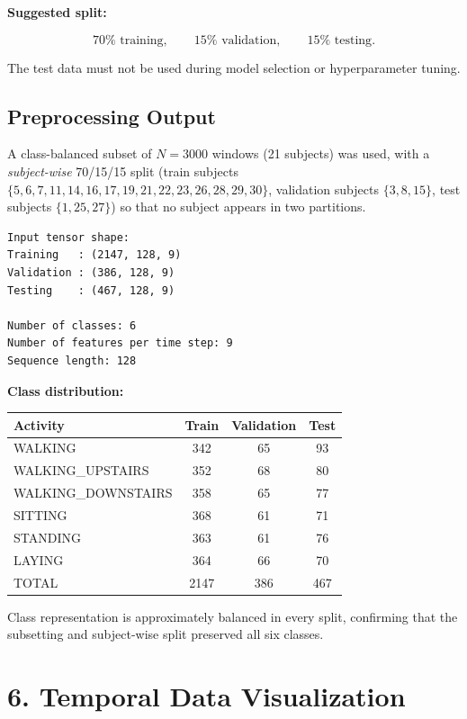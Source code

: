 \documentclass[10pt]{article}
\begin{document}
\textbf{Suggested split:}

\[
70\% \text{ training},\qquad
15\% \text{ validation},\qquad
15\% \text{ testing}.
\]

The test data must not be used during model selection or hyperparameter tuning.

\subsection*{Preprocessing Output}

A class-balanced subset of $N=3000$ windows (21 subjects) was used, with a
\emph{subject-wise} 70/15/15 split (train subjects
$\{5,6,7,11,14,16,17,19,21,22,23,26,28,29,30\}$, validation subjects
$\{3,8,15\}$, test subjects $\{1,25,27\}$) so that no subject appears in two
partitions.

\begin{verbatim}
Input tensor shape:
Training   : (2147, 128, 9)
Validation : (386, 128, 9)
Testing    : (467, 128, 9)

Number of classes: 6
Number of features per time step: 9
Sequence length: 128
\end{verbatim}

\textbf{Class distribution:}

\begin{center}
\begin{tabular}{|l|c|c|c|}
\hline
Activity & Train & Validation & Test\\
\hline
WALKING & 342 & 65 & 93\\
WALKING\_UPSTAIRS & 352 & 68 & 80\\
WALKING\_DOWNSTAIRS & 358 & 65 & 77\\
SITTING & 368 & 61 & 71\\
STANDING & 363 & 61 & 76\\
LAYING & 364 & 66 & 70\\
\hline
TOTAL & 2147 & 386 & 467\\
\hline
\end{tabular}
\end{center}

Class representation is approximately balanced in every split, confirming
that the subsetting and subject-wise split preserved all six classes.

\section*{6. Temporal Data Visualization}
\end{document}
